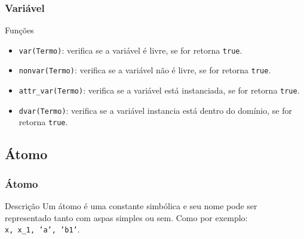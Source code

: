 \documentclass[sans]{beamer}
\begin{document}

\begin{frame}[fragile]   %
\frametitle{Variável}
\begin{block}{Funções}
 \begin{itemize}
  \item \texttt{var(Termo)}: verifica se a variável é livre, se for retorna \texttt{true}.
  \item \texttt{nonvar(Termo)}: verifica se a variável não é livre, se for retorna \texttt{true}.
  \item \texttt{attr\_var(Termo)}: verifica se a variável está instanciada, se for retorna \texttt{true}.
  \item \texttt{dvar(Termo)}: verifica se a variável instancia está dentro do domínio, se for retorna \texttt{true}.
 \end{itemize}

\end{block}
\end{frame}


\subsection{Átomo}
\begin{frame}[fragile]   %
\frametitle{Átomo}
\begin{block}{Descrição}
 Um átomo é uma constante simbólica e seu nome pode ser representado tanto com aspas simples ou sem. Como por exemplo:\\
 \texttt{x, x\_1, 'a', 'b1'}.
\end{block}
\end{frame}

\end{document}
